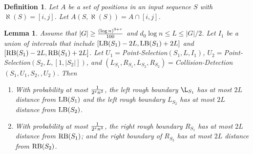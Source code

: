 \documentclass[11pt]{article}
\newtheorem{lemmafoo}[theoremfoo]{Lemma}
\newenvironment{lemma}{\pagebreak[1]\begin{lemmafoo}}{\end{lemmafoo}}
\newtheorem{dfntn}[theoremfoo]{Definition}
\newenvironment{definition}{\pagebreak[1]\begin{dfntn}\rm}{\end{dfntn}}
\newcommand{\LB}{{\rm LB}}
\newcommand{\RB}{{\rm RB}}
\newcommand{\thresholdL}{{(\log n)^{3+\tau}\over 100}}
\begin{document}
\begin{definition}
Let $A$ be a set of positions in an input sequence $S$ with
$\aleph(S)=[i,j]$. Let $A(S,\aleph(S))=A\cap [i,j]$.
\end{definition}




\begin{lemma}\label{collision-lemma} Assume that  $|G|\ge \thresholdL$ and $d_0\log n\le L\le |G|/2$.
Let $I_1$ be a union of intervals that include $[\LB(S_1)-2L,
\LB(S_1)+2L]$ and $[\RB(S_1)-2L, \RB(S_1)+2L]$. Let
$U_1=$Point-Selection$(S_1,L, I_1)$,
$U_2=$Point-Selection$(S_2,L,[1,|S_2|])$,   and
  $(L_{S_1},R_{S_1},L_{S_2},R_{S_2})=$Collision-Detection$(S_1,U_1,S_2,,U_2)$.
Then
\begin{enumerate}
\item
With probability at most ${1\over 2^{x}n^{3}}$, the left rough
boundary $\L_{S_1}$ has at most $2L$ distance from $\LB(S_1)$ and
the left rough boundary $L_{S_2}$ has at most $2L$ distance from
$\LB(S_2)$.

\item
 With probability at most ${1\over 2^{x}n^{3}}$, the right rough boundary $R_{S_1}$ has at most
$2L$ distance from $\RB(S_1)$; and the right boundary of $R_{S_2}$
has at most $2L$ distance from $\RB(S_2)$.
\end{enumerate}
\end{lemma}
\end{document}

